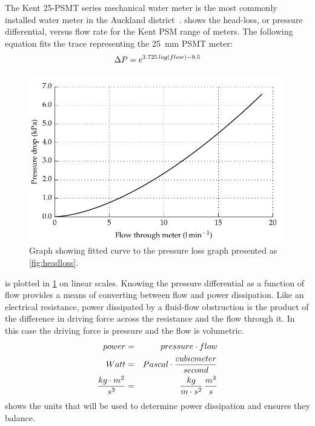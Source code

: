     The Kent 25-PSMT series mechanical water meter is the most commonly installed water meter in the Auckland district~\cite{WatercareNewZealand2014}.
     shows the head-loss, or pressure differential, versus flow rate for the Kent PSM range of meters.
    The following equation fits the trace representing the \SI{25}{\milli\meter} PSMT meter:
    \begin{equation}
        \Delta P = e^{3.725\thinspace log(flow) - 9.5}
        \label{eqn:Flow_to_pressure_25mmPSMT}
    \end{equation}

    \begin{figure}
        \centering
        \includegraphics[width=\linewidth]{content/pt1/02-WirelessWaterMeter/graphics/graph_pressureLoss}
        \caption{Graph showing fitted curve to the pressure loss graph presented as \cref{fig:headloss}.}
        \label{fig:headloss_fit}
    \end{figure}

     is plotted in \cref{fig:headloss_fit} on linear scales.
    Knowing the pressure differential as a function of flow provides a means of converting between flow and power dissipation.
    Like an electrical resistance, power dissipated by a fluid-flow obstruction is the product of the difference in driving force across the resistance and the flow through it.
    In this case the driving force is pressure and the flow is volumetric.
    \begin{eqnarray}
        power &=& pressure \cdot flow\nonumber \\
        Watt &=& Pascal \cdot \frac{cubic meter}{second}\nonumber \\
        \frac{kg\cdot m^{2}}{s^{3}} &=& \frac{kg}{m\cdot  s^{2}} \thinspace \frac{m^{3}}{s}\\
        \label{eqn:pressure_flow_to_power}
    \end{eqnarray}
     shows the units that will be used to determine power dissipation and ensures they balance.

